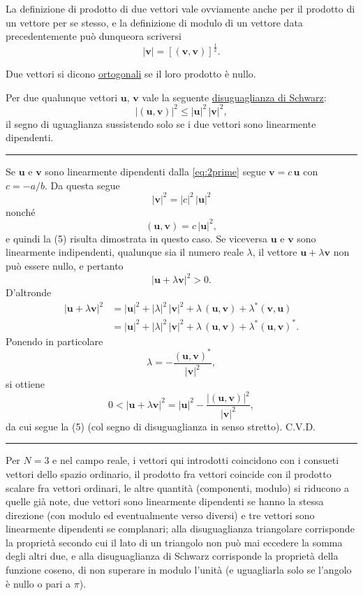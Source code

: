 \documentclass[11pt, a4paper]{book}
\numberwithin{equation}{section}
\begin{document}
La definizione di prodotto di due vettori vale ovviamente anche per il prodotto di un vettore per se stesso, e la definizione di modulo di un vettore data precedentemente può dunqueora scriversi
\begin{equation}
    |\mathbf{v}| = \left[ (\mathbf{v}, \mathbf{v}) \right]^{\frac{1}{2}}.
    \tag{1c}
\end{equation}

Due vettori si dicono \underline{ortogonali} se il loro prodotto è nullo.

Per due qualunque vettori $\mathbf{u}$, $\mathbf{v}$ vale la seguente \underline{disuguaglianza di Schwarz}:
\begin{equation}
    |(\mathbf{u}, \mathbf{v})|^2 \leq |\mathbf{u}|^2\, |\mathbf{v}|^2,
    \tag{5}
\end{equation}
il segno di uguaglianza sussistendo solo se i due vettori sono linearmente dipendenti.

\medskip
\noindent\rule{\linewidth}{0.4pt}

\noindent Se $\mathbf{u}$ e $\mathbf{v}$ sono linearmente dipendenti dalla \eqref{eq:2prime} segue $\mathbf{v} = c\,\mathbf{u}$ con $c = -a/b$. Da questa segue
\[
    |\mathbf{v}|^2 = |c|^2\, |\mathbf{u}|^2
\]
nonché
\[
    (\mathbf{u}, \mathbf{v}) = c\, |\mathbf{u}|^2,
\]
e quindi la (5) risulta dimostrata in questo caso. Se viceversa $\mathbf{u}$ e $\mathbf{v}$ sono linearmente indipendenti, qualunque sia il numero reale $\lambda$, il vettore $\mathbf{u} + \lambda\mathbf{v}$ non può essere nullo, e pertanto
\[
    |\mathbf{u} + \lambda\mathbf{v}|^2 > 0.
\]
D'altronde
\begin{align*}
    |\mathbf{u} + \lambda\mathbf{v}|^2
    &= |\mathbf{u}|^2 + |\lambda|^2\,|\mathbf{v}|^2 + \lambda\,(\mathbf{u},\mathbf{v}) + \lambda^*(\mathbf{v},\mathbf{u}) \\
    &= |\mathbf{u}|^2 + |\lambda|^2\,|\mathbf{v}|^2 + \lambda\,(\mathbf{u},\mathbf{v}) + \lambda^*(\mathbf{u},\mathbf{v})^*.
\end{align*}
Ponendo in particolare
\[
    \lambda = -\frac{(\mathbf{u},\mathbf{v})^*}{|\mathbf{v}|^2},
\]
si ottiene
\[
    0 < |\mathbf{u} + \lambda\mathbf{v}|^2 = |\mathbf{u}|^2 - \frac{|(\mathbf{u},\mathbf{v})|^2}{|\mathbf{v}|^2},
\]
da cui segue la (5) (col segno di disuguaglianza in senso stretto). C.V.D.

\noindent\rule{\linewidth}{0.4pt}
\medskip

Per $N = 3$ e nel campo reale, i vettori qui introdotti coincidono con i consueti vettori dello spazio ordinario, il prodotto fra vettori coincide con il prodotto scalare fra vettori ordinari, le altre quantità (componenti, modulo) si riducono a quelle già note, due vettori sono linearmente dipendenti se hanno la stessa direzione (con modulo ed eventualmente verso diversi) e tre vettori sono linearmente dipendenti se complanari; alla disuguaglianza triangolare corrisponde la proprietà secondo cui il lato di un triangolo non può mai eccedere la somma degli altri due, e alla disuguaglianza di Schwarz corrisponde la proprietà della funzione coseno, di non superare in modulo l'unità (e uguagliarla solo se l'angolo è nullo o pari a $\pi$).
\end{document}
